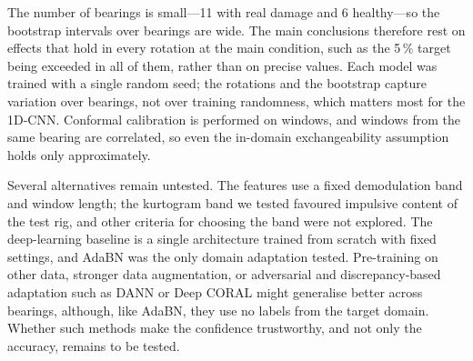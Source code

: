 The number of bearings is small---11 with real damage and 6 healthy---so the bootstrap intervals over bearings are
wide. The main conclusions therefore rest on effects that hold in every rotation at the main condition, such as the
5\,\% target being exceeded in all of them, rather than on precise values. Each model was trained with a single random
seed; the rotations and the bootstrap capture variation over bearings, not over training randomness, which matters
most for the 1D-CNN. Conformal calibration is performed on windows, and windows from the same bearing are correlated,
so even the in-domain exchangeability assumption holds only approximately.

Several alternatives remain untested. The features use a fixed demodulation band and window length; the kurtogram
band we tested favoured impulsive content of the test rig, and other criteria for choosing the band were not
explored. The deep-learning baseline is a single architecture trained from scratch with fixed settings, and AdaBN was
the only domain adaptation tested. Pre-training on other data, stronger data augmentation, or adversarial and
discrepancy-based adaptation such as DANN \citep{ganin2016} or Deep CORAL \citep{sun2016} might generalise better
across bearings, although, like AdaBN, they use no labels from the target domain. Whether such methods make the
confidence trustworthy, and not only the accuracy, remains to be tested.
